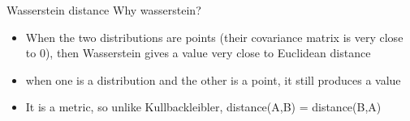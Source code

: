 \begin{frame}{Wasserstein distance}
    Why wasserstein?
    \begin{itemize}
        \item When the two distributions are points (their covariance matrix is very close to 0), then Wasserstein gives a value very close to Euclidean distance
        \item when one is a distribution and the other is a point, it still produces a value
        \item It is a metric, so unlike Kullbackleibler, distance(A,B) = distance(B,A)
    \end{itemize}
\end{frame}